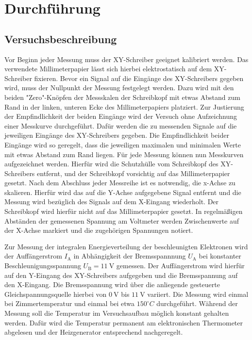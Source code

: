 \section{Durchführung}
\label{sec:Durchführung}



\subsection{Versuchsbeschreibung}
\label{sec:Versuchsbeschreibung}
Vor Beginn jeder Messung muss der XY-Schreiber geeignet kalibriert werden.
Das verwendete Millimeterpapier lässt sich hierbei elektrostatisch auf dem XY-Schreiber fixieren.
Bevor ein Signal auf die Eingänge des XY-Schreibers gegeben wird, muss der Nullpunkt der Messung festgelegt werden. Dazu wird mit den beiden "Zero"-Knöpfen der Messskalen der Schreibkopf mit etwas Abstand zum Rand in der linken, unteren Ecke des Millimeterpapiers platziert.
Zur Justierung der Empfindlichkeit der beiden Eingänge wird der Versuch ohne Aufzeichnung einer Messkurve durchgeführt. Dafür werden die zu messenden Signale auf die jeweiligen Eingänge des XY-Schreibers gegeben.
Die Empfindlichkeit beider Eingänge wird so geregelt, dass die jeweiligen maximalen und minimalen Werte mit etwas Abstand zum Rand liegen.
Für jede Messung können nun Messkurven aufgezeichnet werden. Hierfür wird die Schutzhülle vom Schreibkopf des XY-Schreibers entfernt, und der Schreibkopf vorsichtig auf das Millimeterpapier gesetzt.
Nach dem Abschluss jeder Messreihe ist es notwendig, die x-Achse zu skalieren. Hierfür wird das auf die Y-Achse aufgegebene Signal entfernt und die Messung wird bezüglich des Signals auf dem X-Eingang wiederholt. Der Schreibkopf wird hierfür nicht auf das Millimeterpapier gesetzt.
In regelmäßigen Abständen der gemessenen Spannung am Voltmeter werden Zwischenwerte auf der X-Achse markiert und die zugehörigen Spannungen notiert.

Zur Messung der integralen Energieverteilung der beschleunigten Elektronen wird der Auffängerstrom $I_\mathrm{A}$ in Abhängigkeit der Bremsspannnung $U_\mathrm{A}$ bei konstanter Beschleunigungsspannung $U_\mathrm{B}=\SI{11}{\volt}$ gemessen. Der Auffängerstrom wird hierfür auf den Y-Eingang des XY-Schreibers aufgegeben und die Bremsspannung auf den X-Eingang. Die Bremsspannung wird über die anliegende gesteuerte Gleichspannungsquelle hierbei von $\SI{0}{\volt}$ bis $\SI{11}{\volt}$ variiert.
Die Messung wird einmal bei Zimmertemperatur und einmal bei etwa $150^\circ C$ durchgeführt.
Während der Messung soll die Temperatur im Versuchsaufbau möglich konstant gehalten werden. Dafür wird die Temperatur permanent am elektronischen Thermometer abgelesen und der Heizgenerator entsprechend nachgeregelt.

